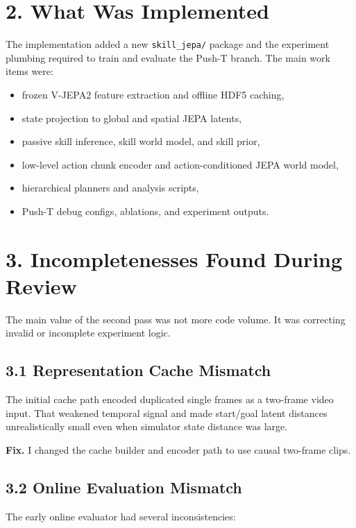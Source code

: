 \documentclass[11pt]{article}
\begin{document}
\section*{2. What Was Implemented}

The implementation added a new \texttt{skill\_jepa/} package and the experiment plumbing required to train and evaluate the Push-T branch.
The main work items were:

\begin{itemize}
\item frozen V-JEPA2 feature extraction and offline HDF5 caching,
\item state projection to global and spatial JEPA latents,
\item passive skill inference, skill world model, and skill prior,
\item low-level action chunk encoder and action-conditioned JEPA world model,
\item hierarchical planners and analysis scripts,
\item Push-T debug configs, ablations, and experiment outputs.
\end{itemize}

\section*{3. Incompletenesses Found During Review}

The main value of the second pass was not more code volume. It was correcting invalid or incomplete experiment logic.

\subsection*{3.1 Representation Cache Mismatch}

The initial cache path encoded duplicated single frames as a two-frame video input.
That weakened temporal signal and made start/goal latent distances unrealistically small even when simulator state distance was large.

\textbf{Fix.}
I changed the cache builder and encoder path to use causal two-frame clips.

\subsection*{3.2 Online Evaluation Mismatch}

The early online evaluator had several inconsistencies:
\end{document}
